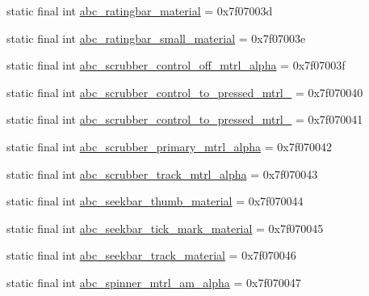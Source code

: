 \begin{DoxyCompactItemize}
\item 
static final int \mbox{\hyperlink{classandroid_1_1support_1_1design_1_1_r_1_1drawable_a4892568eb27960a6aae89fa728e20c43}{abc\+\_\+ratingbar\+\_\+material}} = 0x7f07003d
\item 
static final int \mbox{\hyperlink{classandroid_1_1support_1_1design_1_1_r_1_1drawable_ad398b766ff5f6e6493793c5e6819c621}{abc\+\_\+ratingbar\+\_\+small\+\_\+material}} = 0x7f07003e
\item 
static final int \mbox{\hyperlink{classandroid_1_1support_1_1design_1_1_r_1_1drawable_a3965bd65870ffcee33bd193df53fe534}{abc\+\_\+scrubber\+\_\+control\+\_\+off\+\_\+mtrl\+\_\+alpha}} = 0x7f07003f
\item 
static final int \mbox{\hyperlink{classandroid_1_1support_1_1design_1_1_r_1_1drawable_ae921a145d925b87b9a72c5c36932a1c9}{abc\+\_\+scrubber\+\_\+control\+\_\+to\+\_\+pressed\+\_\+mtrl\+\_}} = 0x7f070040
\item 
static final int \mbox{\hyperlink{classandroid_1_1support_1_1design_1_1_r_1_1drawable_a282a94bb92c284091a6e7739ed35f7d5}{abc\+\_\+scrubber\+\_\+control\+\_\+to\+\_\+pressed\+\_\+mtrl\+\_}} = 0x7f070041
\item 
static final int \mbox{\hyperlink{classandroid_1_1support_1_1design_1_1_r_1_1drawable_a3f0286813be68f3820c8e9faae29a3e9}{abc\+\_\+scrubber\+\_\+primary\+\_\+mtrl\+\_\+alpha}} = 0x7f070042
\item 
static final int \mbox{\hyperlink{classandroid_1_1support_1_1design_1_1_r_1_1drawable_a6a7b5d719e7966bf2bd70f2b9528a60e}{abc\+\_\+scrubber\+\_\+track\+\_\+mtrl\+\_\+alpha}} = 0x7f070043
\item 
static final int \mbox{\hyperlink{classandroid_1_1support_1_1design_1_1_r_1_1drawable_a4f8f86163f9c4645c593a97391e7c5fd}{abc\+\_\+seekbar\+\_\+thumb\+\_\+material}} = 0x7f070044
\item 
static final int \mbox{\hyperlink{classandroid_1_1support_1_1design_1_1_r_1_1drawable_a84b4fc6424bc42099b2371803cdd52d7}{abc\+\_\+seekbar\+\_\+tick\+\_\+mark\+\_\+material}} = 0x7f070045
\item 
static final int \mbox{\hyperlink{classandroid_1_1support_1_1design_1_1_r_1_1drawable_a7779d5fb55171a8b737a2cc5a546ccbc}{abc\+\_\+seekbar\+\_\+track\+\_\+material}} = 0x7f070046
\item 
static final int \mbox{\hyperlink{classandroid_1_1support_1_1design_1_1_r_1_1drawable_ab4ab615c21373d1dce94cb8dd6e3cbe3}{abc\+\_\+spinner\+\_\+mtrl\+\_\+am\+\_\+alpha}} = 0x7f070047
\item 

\end{DoxyCompactItemize}

